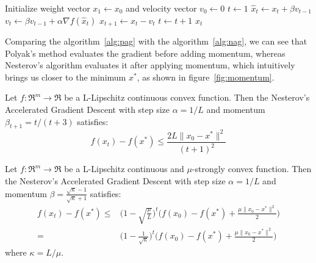 \begin{algorithm}[H]
	\caption{Nesterov's Accelerated Gradient Descent or Nesterov Heavy-Ball method}
	\label{alg:nag}
	\begin{algorithmic}
		\Require{Momentum $\beta \in [0,1)$}
			\State Initialize weight vector $x_1 \gets x_0$ and velocity vector $v_0 \gets 0$
			\State $t \gets 1$
				\State $\hat{x}_t \gets x_t + \beta v_{t-1}$
				\State $v_t \gets \beta v_{t-1} + \alpha \nabla f(\hat{x}_t)$
				\State $x_{t+1} \gets x_t - v_t$
				\State $t \gets t + 1$
			\EndWhile
			\State \Return $x_t$
		\EndFunction
	\end{algorithmic}
\end{algorithm}

Comparing the algorithm~\ref{alg:pag} with the algorithm~\ref{alg:nag}, we can see that Polyak’s method evaluates the gradient before adding momentum, whereas Nesterov’s algorithm evaluates it after applying momentum, which intuitively brings us closer to the minimum $x^*$, as shown in figure~\ref{fig:momentum}.

\begin{theorem}[\href{http://www.princeton.edu/~yc5/ele522_optimization/lectures/accelerated_gradient.pdf\#page=31}{Nesterov's Accelerated Gradient Descent convergence for convex functions}] \label{thm:cvx_nag_convergence}
Let $f: \Re^m \rightarrow \Re$ be a L-Lipschitz continuous convex function. Then the Nesterov's Accelerated Gradient Descent with step size $\alpha = 1/L$ and momentum $\beta_{t+1} = t / (t+3)$ satisfies:
$$
f(x_t) - f(x^*) \leq \frac{2L \| x_0 - x^* \|^2}{(t+1)^2}
$$
\end{theorem}

\begin{theorem}[\href{http://www.princeton.edu/~yc5/ele522_optimization/lectures/accelerated_gradient.pdf\#page=38}{Nesterov's Accelerated Gradient Descent convergence for strongly convex functions}] \label{thm:str_cvx_nag_convergence}
Let $f: \Re^m \rightarrow \Re$ be a L-Lipschitz continuous and $\mu$-strongly convex function. Then the Nesterov's Accelerated Gradient Descent with step size $\alpha = 1/L$ and momentum $\beta = \displaystyle \frac{\sqrt{\kappa}-1}{\sqrt{\kappa}+1}$ satisfies:
$$
\begin{aligned}
	f(x_t) - f(x^*) \leq & \Bigg(1 - \sqrt{\frac{\mu}{L}}\Bigg)^t \Bigg(f(x_0) - f(x^*) + \frac{\mu \| x_0 - x^* \|^2}{2}\Bigg) \\
						= & \Bigg(1 - \frac{1}{\sqrt{\kappa}}\Bigg)^t \Bigg(f(x_0) - f(x^*) + \frac{\mu \| x_0 - x^* \|^2}{2}\Bigg)
\end{aligned}
$$
where $\kappa = L/\mu$.
\end{theorem}

